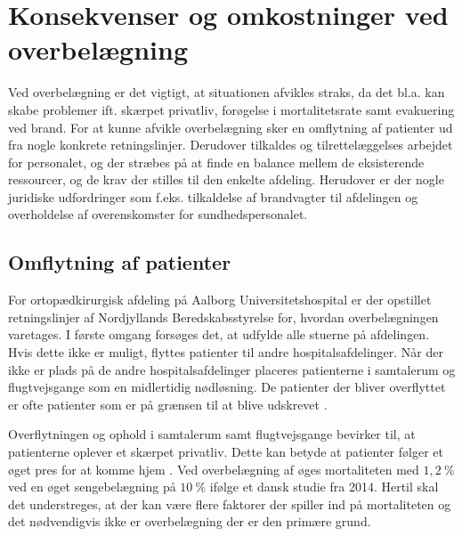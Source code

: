 \section{Konsekvenser og omkostninger ved overbelægning}
Ved overbelægning er det vigtigt, at situationen afvikles straks, da det bl.a. kan skabe problemer ift. skærpet privatliv, forøgelse i mortalitetsrate samt evakuering ved brand. \cite{Madsen2014} For at kunne afvikle overbelægning sker en omflytning af patienter ud fra nogle konkrete retningslinjer. \cite{Beredskab2016} Derudover tilkaldes og tilrettelæggelses arbejdet for personalet, og der stræbes på at finde en balance mellem de eksisterende ressourcer, og de krav der stilles til den enkelte afdeling. \cite{Bjerg2016} Herudover er der nogle juridiske udfordringer som f.eks. tilkaldelse af brandvagter til afdelingen og overholdelse af overenskomster for sundhedspersonalet. \cite{Beredskab2016}


\subsection{Omflytning af patienter}
For ortopædkirurgisk afdeling på Aalborg Universitetshospital er der opstillet retningslinjer af Nordjyllands Beredskabsstyrelse for, hvordan overbelægningen varetages. I første omgang forsøges det, at udfylde alle stuerne på afdelingen. Hvis dette ikke er muligt, flyttes patienter til andre hospitalsafdelinger. Når der ikke er plads på de andre hospitalsafdelinger placeres patienterne i samtalerum og flugtvejsgange som en midlertidig nødløsning. \cite{Beredskab2016} De patienter der bliver overflyttet er ofte patienter som er på grænsen til at blive udskrevet .


Overflytningen og ophold i samtalerum samt flugtvejsgange bevirker til, at patienterne oplever et skærpet privatliv. \cite{Madsen2014} Dette kan betyde at patienter følger et øget pres for at komme hjem . Ved overbelægning af øges mortaliteten med $1,2~\%$ ved en øget sengebelægning på $10~\%$ ifølge et dansk studie fra 2014. \cite{Madsen2014} Hertil skal det understreges, at der kan være flere faktorer der spiller ind på mortaliteten og det nødvendigvis ikke er overbelægning der er den primære grund. 


